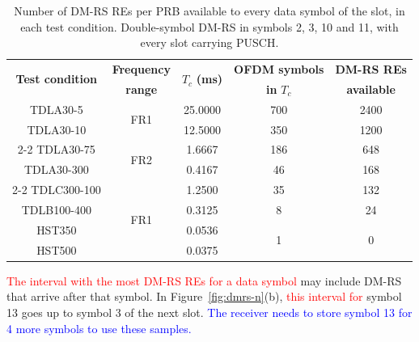 \begin{table}[htbp]
\caption[Number of DM-RS REs per PRB available to every data symbol of the slot, in each test condition.]{Number of DM-RS REs per PRB available to every data symbol of the slot, in each test condition. Double-symbol DM-RS in symbols 2, 3, 10 and 11, with every slot carrying PUSCH.}
\label{tab:n-maximo}
\vspace{4pt}
\centering
\footnotesize
\renewcommand{\arraystretch}{1.2}
\setlength{\aboverulesep}{0pt}
\setlength{\belowrulesep}{0pt}
\begin{tabular}{|c|c|c|c|c|}
\toprule
\multirow{2}{*}{\textbf{Test condition}} & \textbf{Frequency} & \multirow{2}{*}{{\boldmath $T_c$} \textbf{(ms)}} & \textbf{OFDM symbols} & \textbf{DM-RS REs} \\
 & \textbf{range} & & \textbf{in} {\boldmath $T_c$} & \textbf{available} \\
\midrule
TDLA30-5    & \multirow{2}{*}{FR1} & 25.0000 & 700 & 2400 \\
TDLA30-10   &                      & 12.5000 & 350 & 1200 \\
\cline{2-2}
TDLA30-75   & \multirow{2}{*}{FR2} & 1.6667  & 186 & 648 \\
TDLA30-300  &                      & 0.4167  & 46  & 168 \\
\cline{2-2}
TDLC300-100 & \multirow{4}{*}{FR1} & 1.2500  & 35  & 132 \\
TDLB100-400 &                      & 0.3125  & 8   & 24 \\
HST350      &                      & 0.0536  & \multirow{2}{*}{1} & \multirow{2}{*}{0} \\
HST500      &                      & 0.0375  &     &  \\
\bottomrule
\end{tabular}
\vspace{4pt}
\end{table}

\textcolor{red}{The interval with the most DM-RS REs for a data symbol} may include DM-RS that arrive after that symbol. In Figure~\ref{fig:dmrs-n}(b), \textcolor{red}{this interval for} symbol 13 goes up to symbol 3 of the next slot. \textcolor{blue}{The receiver needs to store symbol 13 for 4 more symbols to use these samples.}

